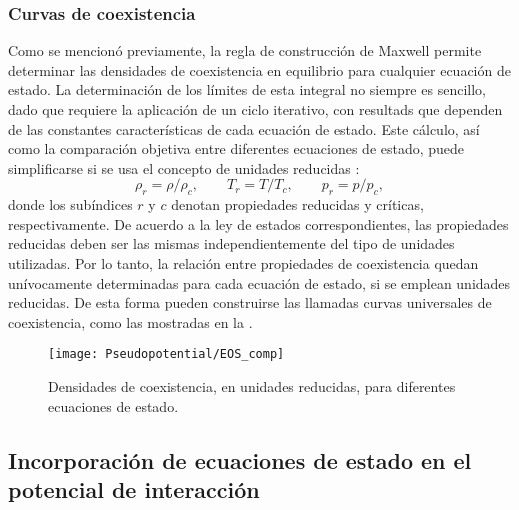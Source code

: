 

\subsubsection*{Curvas de coexistencia}

Como se mencion\'o previamente, la regla de construcci\'on de Maxwell permite determinar las densidades de coexistencia en equilibrio para cualquier ecuaci\'on de estado. La determinaci\'on de los l\'imites de esta integral no siempre es sencillo, dado que requiere la aplicaci\'on de un ciclo iterativo, con resultads que dependen de las constantes caracter\'isticas de cada ecuaci\'on de estado. Este c\'alculo, as\'i como la comparaci\'on objetiva entre diferentes ecuaciones de estado, puede simplificarse si se usa el concepto de unidades reducidas \cite{mcquarrie_molecular_1999}:
\begin{equation}
	\rho_r = \rho / \rho_c, \qquad T_r = T / T_c, \qquad p_r = p / p_c,
\end{equation}
donde los sub\'indices $r$ y $c$ denotan propiedades reducidas y cr\'iticas, respectivamente. De acuerdo a la ley de estados correspondientes, las propiedades reducidas deben ser las mismas independientemente del tipo de unidades utilizadas. Por lo tanto, la relaci\'on entre propiedades de coexistencia quedan un\'ivocamente determinadas para cada ecuaci\'on de estado, si se emplean unidades reducidas. De esta forma pueden construirse las llamadas curvas universales de coexistencia, como las mostradas en la .

\begin{figure}[ht]
	\centering
	\texttt{[image: Pseudopotential/EOS\_comp]}
	\caption{Densidades de coexistencia, en unidades reducidas, para diferentes ecuaciones de estado.}
	\label{fig:EOS}
\end{figure}





\subsection{Incorporaci\'on de ecuaciones de estado en el potencial de interacci\'on}

